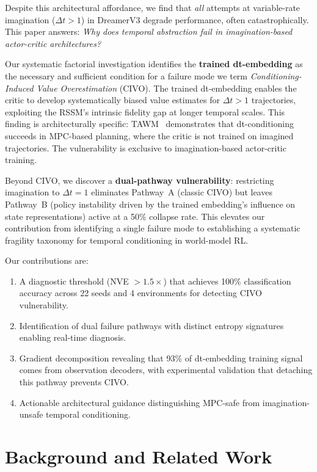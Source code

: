 \documentclass[10pt,letterpaper]{article}
\begin{document}
Despite this architectural affordance, we find that \emph{all} attempts at variable-rate imagination ($\Delta t > 1$) in DreamerV3 degrade performance, often catastrophically. This paper answers: \emph{Why does temporal abstraction fail in imagination-based actor-critic architectures?}

Our systematic factorial investigation identifies the \textbf{trained dt-embedding} as the necessary and sufficient condition for a failure mode we term \emph{Conditioning-Induced Value Overestimation} (CIVO). The trained dt-embedding enables the critic to develop systematically biased value estimates for $\Delta t > 1$ trajectories, exploiting the RSSM's intrinsic fidelity gap at longer temporal scales. This finding is architecturally specific: TAWM~\cite{nhu2025tawm} demonstrates that dt-conditioning succeeds in MPC-based planning, where the critic is not trained on imagined trajectories. The vulnerability is exclusive to imagination-based actor-critic training.

Beyond CIVO, we discover a \textbf{dual-pathway vulnerability}: restricting imagination to $\Delta t = 1$ eliminates Pathway~A (classic CIVO) but leaves Pathway~B (policy instability driven by the trained embedding's influence on state representations) active at a 50\% collapse rate. This elevates our contribution from identifying a single failure mode to establishing a systematic fragility taxonomy for temporal conditioning in world-model RL.

Our contributions are:
\begin{enumerate}[nosep]
\item A diagnostic threshold (NVE $> 1.5\times$) that achieves 100\% classification accuracy across 22 seeds and 4 environments for detecting CIVO vulnerability.
\item Identification of dual failure pathways with distinct entropy signatures enabling real-time diagnosis.
\item Gradient decomposition revealing that 93\% of dt-embedding training signal comes from observation decoders, with experimental validation that detaching this pathway prevents CIVO.
\item Actionable architectural guidance distinguishing MPC-safe from imagination-unsafe temporal conditioning.
\end{enumerate}

\section{Background and Related Work}
\end{document}
